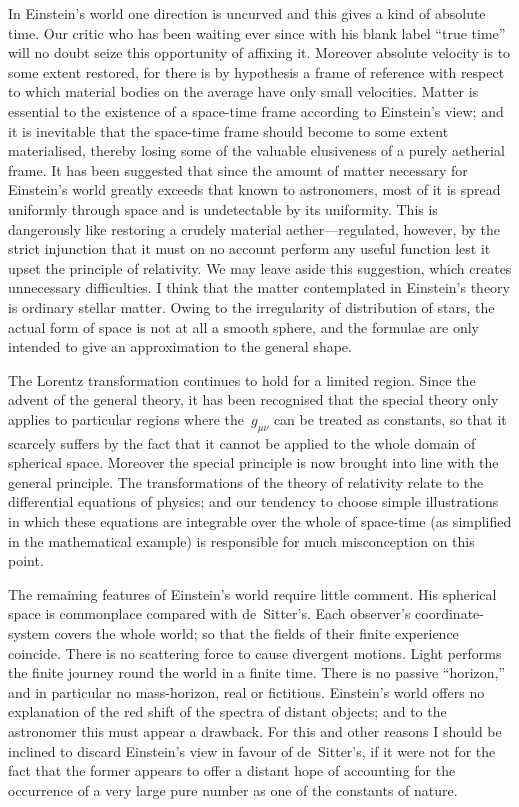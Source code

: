 \documentclass[12pt]{book}
\begin{document}
In Einstein's world one direction is uncurved and this gives a kind of
absolute time. Our critic who has been waiting ever since  with his blank
label ``true time'' will no doubt seize this opportunity of affixing it. Moreover
absolute velocity is to some extent restored, for there is by hypothesis a
frame of reference with respect to which material bodies on the average have
only small velocities. Matter is essential to the existence of a space-time
frame according to Einstein's view; and it is inevitable that the space-time
frame should become to some extent materialised, thereby losing some of the
valuable elusiveness of a purely aetherial frame. It has been suggested that
since the amount of matter necessary for Einstein's world greatly exceeds that
known to astronomers, most of it is spread uniformly through space and is
undetectable by its uniformity. This is dangerously like restoring a crudely
material aether---regulated, however, by the strict injunction that it must on
no account perform any useful function lest it upset the principle of relativity.
We may leave aside this suggestion, which creates unnecessary difficulties.
I think that the matter contemplated in Einstein's theory is ordinary stellar
matter. Owing to the irregularity of distribution of stars, the actual form of
space is not at all a smooth sphere, and the formulae are only intended to give
an approximation to the general shape.

The Lorentz transformation continues to hold for a limited region. Since
the advent of the general theory, it has been recognised that the special theory
only applies to particular regions where the~$g_{\mu\nu}$ can be treated as constants, so
that it scarcely suffers by the fact that it cannot be applied to the whole
domain of spherical space. Moreover the special principle is now brought into
line with the general principle. The transformations of the theory of relativity
relate to the differential equations of physics; and our tendency to choose
simple illustrations in which these equations are integrable over the whole of
space-time (as simplified in the mathematical example) is responsible for much
misconception on this point.

The remaining features of Einstein's world require little comment. His
spherical space is commonplace compared with de~Sitter's. Each observer's
coordinate-system covers the whole world; so that the fields of their finite
experience coincide. There is no scattering force to cause divergent motions.
Light performs the finite journey round the world in a finite time. There is
no passive ``horizon,'' and in particular no mass-horizon, real or fictitious.
Einstein's world offers no explanation of the red shift of the spectra of distant
objects; and to the astronomer this must appear a drawback. For this and
other reasons I should be inclined to discard Einstein's view in favour of
de~Sitter's, if it were not for the fact that the former appears to offer a distant
hope of accounting for the occurrence of a very large pure number as one of
the constants of nature.
\end{document}

